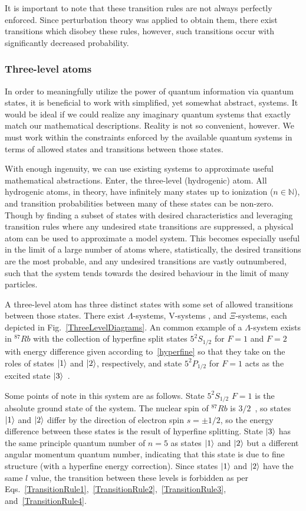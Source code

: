 \documentclass[aps,pra,showpacs,amsmath,amssymb,nofootinbib,longbibliography,superscriptaddress
]{revtex4-1}
\DeclarePairedDelimiter\ket{\lvert}{\rangle}
\theoremstyle{definition}
\theoremstyle{remark}
\newcommand{\0}{\hat{0}}
\begin{document}
It is important to note that these transition rules are not always perfectly enforced. Since perturbation theory was applied to obtain them, there exist transitions which disobey these rules, however, such transitions occur with significantly decreased probability.


\subsubsection{Three-level atoms}\label{ThreeLevelSection}

In order to meaningfully utilize the power of quantum information via quantum states, it is beneficial to work with simplified, yet somewhat abstract, systems. It would be ideal if we could realize any imaginary quantum systems that exactly match our mathematical descriptions. Reality is not so convenient, however. We must work within the constraints enforced by the available quantum systems in terms of allowed states and transitions between those states.

With enough ingenuity, we can use existing systems to approximate useful mathematical abstractions. Enter, the three-level (hydrogenic) atom. All hydrogenic atoms, in theory, have infinitely many states up to ionization ($n \in \mathbb{N}$), and transition probabilities between many of these states can be non-zero. Though by finding a subset of states with desired characteristics and leveraging transition rules where any undesired state transitions are suppressed, a physical atom can be used to approximate a model system. This becomes especially useful in the limit of a large number of atoms where, statistically, the desired transitions are the most probable, and any undesired transitions are vastly outnumbered, such that the system tends towards the desired behaviour in the limit of many particles.

A three-level atom has three distinct states with some set of allowed transitions between those states. There exist $\Lambda$-systems, V-systems , and $\Xi$-systems, each depicted in Fig.~\ref{ThreeLevelDiagrams}. An common example of a $\Lambda$-system exists in $^{87}Rb$ with the collection of hyperfine split states $5^{2}S_{1/2}$ for $F=1$ and $F=2$ with energy difference given according to~\eqref{hyperfine} so that they take on the roles of states $\ket{1}$ and $\ket{2}$, respectively, and state $5^{2}P_{1/2}$ for $F=1$ acts as the excited state $\ket{3}$~\cite{Xiao}.

Some points of note in this system are as follows. State $5^{2}S_{1/2}$ $F=1$ is the absolute ground state of the system. The nuclear spin of $^{87}Rb$ is $3/2$~\cite{Millman}, so states $\ket{1}$ and $\ket{2}$ differ by the direction of electron spin $s = \pm 1/2$, so the energy difference between these states is the result of hyperfine splitting. State $\ket{3}$ has the same principle quantum number of $n=5$ as states $\ket{1}$ and $\ket{2}$ but a different angular momentum quantum number, indicating that this state is due to fine structure (with a hyperfine energy correction). Since states $\ket{1}$ and $\ket{2}$ have the same $l$ value, the transition between these levels is forbidden as per Eqs.~\eqref{TransitionRule1},~\eqref{TransitionRule2},~\eqref{TransitionRule3}, and~\eqref{TransitionRule4}.
\end{document}
